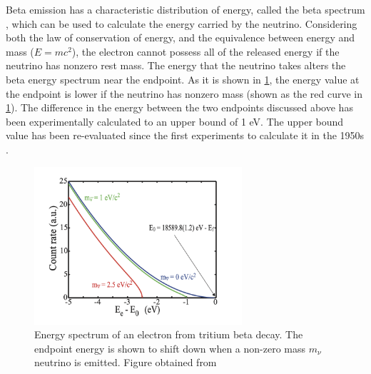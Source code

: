 \documentclass[a4paper,12pt, notitlepage]{article}
\begin{document}
Beta emission has a characteristic distribution of energy, called the beta spectrum \cite{Knoll2010}, which can be used to calculate the energy carried by the neutrino. Considering both the law of conservation of energy, and the equivalence between energy and mass ($E = m c^{2}$), the electron cannot possess all of the released energy if the neutrino has nonzero rest mass. The energy that the neutrino takes alters the beta energy spectrum near the endpoint. As it is shown in \cref{fig:fig02}, the energy value at the endpoint is lower if the neutrino has nonzero mass (shown as the red curve in \cref{fig:fig02}). The difference in the energy between the two endpoints discussed above has been experimentally calculated to an upper bound of 1 eV. The upper bound value has been re-evaluated since the first experiments to calculate it in the 1950s \cite{Reines1953}.

\begin{figure}[hbt!]
\centering
\includegraphics[width=77mm]{pictures/betaDecaySpectrum.png}
\vspace{-2mm}
\caption{Energy spectrum of an electron from tritium beta decay. The endpoint energy is shown to shift down when a non-zero mass $m_{\nu}$ neutrino is emitted. Figure obtained from \cite{Diehl2011}}
\label{fig:fig02}
\end{figure}
\end{document}
